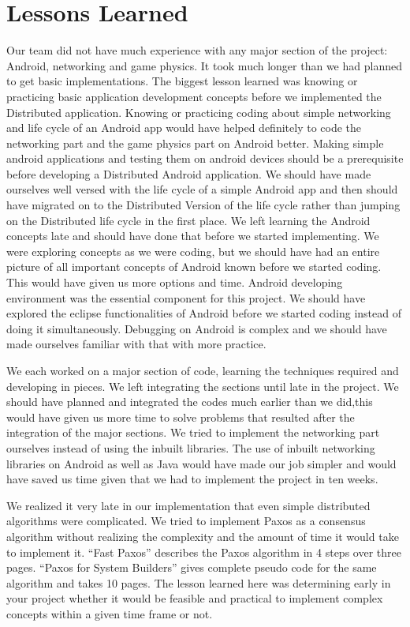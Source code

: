 \documentclass{sig-alternate}
\begin{document}
\section{Lessons Learned}
\label{lessons}

Our team did not have much experience with any major section of the
project: Android, networking and game physics.  It took much longer than we
had planned to get basic implementations.  The biggest lesson learned was
knowing or practicing basic application development concepts before we
implemented the Distributed application.  Knowing or practicing coding
about simple networking and life cycle of an Android app would have helped
definitely to code the networking part and the game physics part on Android
better.  Making simple android applications and testing them on android
devices should be a prerequisite before developing a Distributed Android
application.  We should have made ourselves well versed with the life cycle
of a simple Android app and then should have migrated on to the Distributed
Version of the life cycle rather than jumping on the Distributed life cycle
in the first place.  We left learning the Android concepts late and should
have done that before we started implementing.  We were exploring concepts
as we were coding, but we should have had an entire picture of all
important concepts of Android known before we started coding.  This would
have given us more options and time.  Android developing environment was
the essential component for this project.  We should have explored the
eclipse functionalities of Android before we started coding instead of
doing it simultaneously.  Debugging on Android is complex and we should
have made ourselves familiar with that with more practice.

We each worked on a major section of code, learning the techniques required
and developing in pieces.  We left integrating the sections until late in
the project.  We should have planned and integrated the codes much earlier
than we did,this would have given us more time to solve problems that
resulted after the integration of the major sections.  We tried to
implement the networking part ourselves instead of using the inbuilt
libraries.  The use of inbuilt networking libraries on Android as well as
Java would have made our job simpler and would have saved us time given
that we had to implement the project in ten weeks.

We realized it very late in our implementation that even simple distributed
algorithms were complicated.  We tried to implement Paxos as a consensus
algorithm without realizing the complexity and the amount of time it would
take to implement it.  ``Fast Paxos''\cite{lamport:fast} describes the
Paxos algorithm in 4 steps over three pages.  ``Paxos for System
Builders''\cite{kirsch:paxos} gives complete pseudo code for the same
algorithm and takes 10 pages.  The lesson learned here was determining
early in your project whether it would be feasible and practical to
implement complex concepts within a given time frame or not.
\end{document}
